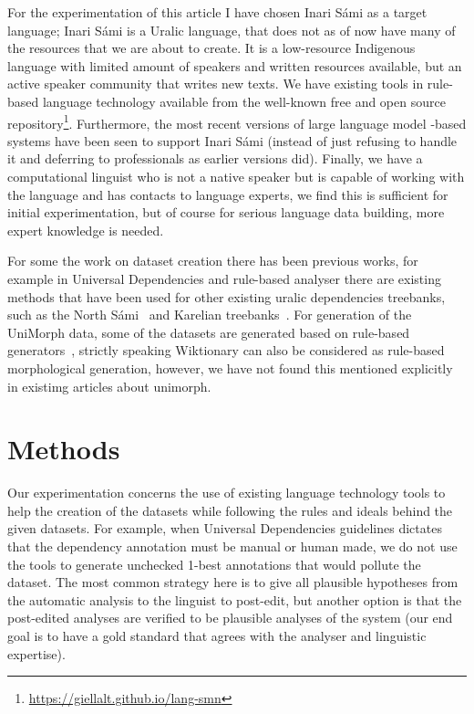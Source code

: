 \documentclass[free]{flammie}
\begin{document}
For the experimentation of this article I have chosen Inari Sámi as a target
language; Inari Sámi is a Uralic language, that does not as of now have many of
the resources that we are about to create.  It is a low-resource Indigenous
language with limited amount of speakers and written resources available, but an
active speaker community that writes new texts.  We have existing tools in
rule-based language technology available from the well-known free and open
source repository\footnote{\url{https://giellalt.github.io/lang-smn}}.
Furthermore, the most recent versions of large language model -based systems
have been seen to support Inari Sámi (instead of just refusing to handle it and
deferring to professionals as earlier versions did).  Finally, we have a
computational linguist who is not a native speaker but is capable of working
with the language and has contacts to language experts, we find this is
sufficient for initial experimentation, but of course for serious language data
building, more expert knowledge is needed.

For some the work on dataset creation there has been previous works, for example
in Universal Dependencies and rule-based analyser there are existing methods
that have been used for other existing uralic dependencies treebanks, such as
the North Sámi~\cite{tyers-sheyanova-2017-annotation} and Karelian
treebanks~\cite{pirinen2019building}. For generation of the UniMorph data, some
of the datasets are generated based on rule-based generators~\cite{unimorph},
strictly speaking Wiktionary can also be considered as rule-based morphological
generation, however, we have not found this mentioned explicitly in existimg
articles about unimorph.


\section{Methods}

Our experimentation concerns the use of existing language technology tools to
help the creation of the datasets while following the rules and ideals behind
the given datasets.  For example, when Universal Dependencies guidelines
dictates that the dependency annotation must be manual or human made, we do not
use the tools to generate unchecked 1-best annotations that would pollute the
dataset.  The most common strategy here is to give all plausible hypotheses from
the automatic analysis to the linguist to post-edit, but another option is that
the post-edited analyses are verified to be plausible analyses of the system
(our end goal is to have a gold standard that agrees with the analyser and
linguistic expertise).
\end{document}
